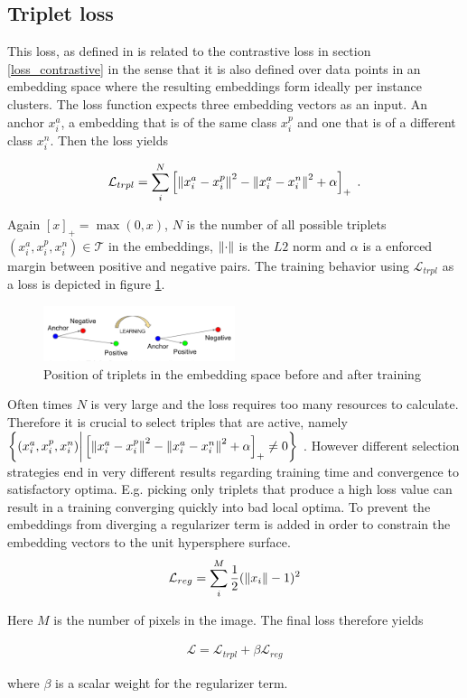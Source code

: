 \subsection{Triplet loss}\label{ssec:loss_triplet}
This loss, as defined in \cite{Schroff_2015} is related to the contrastive loss in section \ref{loss_contrastive} in the sense that it is also defined over data points in an embedding space where the resulting embeddings form ideally per instance clusters. The loss function expects three embedding vectors as an input. An anchor $x_i^a$, a embedding that is of the same class $x_i^p$ and one that is of a different class $x_i^n$. Then the loss yields

\begin{align}
	\mathcal{L}_{trpl} = \sum_i^N \left[ \left\lVert x_i^a - x_i^p\right\rVert^2 - \left\lVert x_i^a - x_i^n\right\rVert^2 + \alpha \right]_+ \text{\hspace{1mm}.}
\end{align} 

Again $[x]_+ = \max(0, x)$, $N$ is the number of all possible triplets $(x_i^a, x_i^p, x_i^n) \in \mathcal{T}$ in the embeddings, $\left\lVert\cdot\right\rVert$ is the $L2$ norm and $\alpha$ is a enforced margin between positive and negative pairs. The training behavior using $\mathcal{L}_{trpl}$ as a loss is depicted in figure \ref{fig_triplet}. \\

\begin{figure}[ht!]
	\centering
	\includegraphics[width=0.5\textwidth]{figures/triplet_loss.png}
	\caption{Position of triplets in the embedding space before and after training \cite{Schroff_2015}}
	\label{fig_triplet}
\end{figure}

Often times $N$ is very large and the loss requires too many resources to calculate. Therefore it is crucial to select triples that are active, namely $\left\{ (x_i^a, x_i^p, x_i^n) \bigg| \left[ \left\lVert x_i^a - x_i^p\right\rVert^2 - \left\lVert x_i^a - x_i^n\right\rVert^2 + \alpha \right]_+ \neq 0 \right\}$ . However different selection strategies end in very different results regarding training time and convergence to satisfactory optima. E.g. picking only triplets that produce a high loss value can result in a training converging quickly into bad local optima.
To prevent the embeddings from diverging a regularizer term is added in order to constrain the embedding vectors to the unit hypersphere surface.
\begin{align}
	\mathcal{L}_{reg} = \sum_i^M\frac{1}{2}(\left\lVert x_i\right\rVert - 1)^2
\end{align}

Here $M$ is the number of pixels in the image. The final loss therefore yields

\begin{align}
\mathcal{L} = \mathcal{L}_{trpl} + \beta \mathcal{L}_{reg}
\end{align}

where $\beta$ is a scalar weight for the regularizer term.